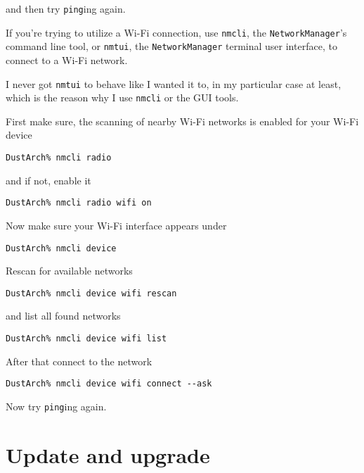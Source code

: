 \documentclass[10pt]{dustdoc}
\begin{document}
\noindent
and then try \texttt{ping}ing again.

If you're trying to utilize a Wi-Fi connection, use \texttt{nmcli}, the \texttt{Network\allowbreak{}Manager}'s command line tool, or \texttt{nmtui}, the \texttt{NetworkManager} terminal user interface, to connect to a Wi-Fi network.

\begin{NOTE}
    I never got \texttt{nmtui} to behave like I wanted it to, in my particular case at least, which is the reason why I use \texttt{nmcli} or the GUI tools.
\end{NOTE}

First make sure, the scanning of nearby Wi-Fi networks is enabled for your Wi-Fi device

\begin{verbatim}
DustArch% nmcli radio
\end{verbatim}

\noindent
and if not, enable it

\begin{verbatim}
DustArch% nmcli radio wifi on
\end{verbatim}

Now make sure your Wi-Fi interface appears under

\begin{verbatim}
DustArch% nmcli device
\end{verbatim}

Rescan for available networks

\begin{verbatim}
DustArch% nmcli device wifi rescan
\end{verbatim}

\noindent
and list all found networks

\begin{verbatim}
DustArch% nmcli device wifi list
\end{verbatim}

After that connect to the network

\begin{verbatim}
DustArch% nmcli device wifi connect --ask
\end{verbatim}

Now try \texttt{ping}ing again.

\section{Update and upgrade}
\label{sec:update-and-upgrade}
\end{document}
